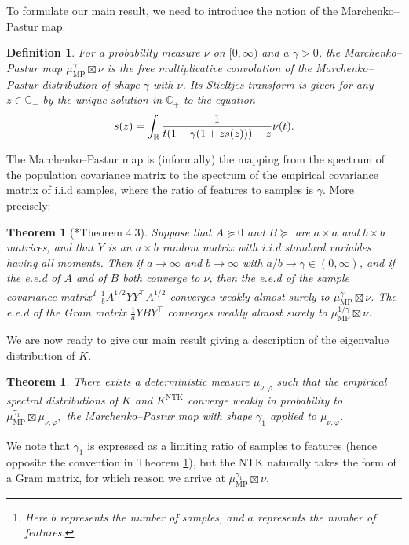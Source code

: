 \documentclass[letterpaper, 10pt, dvipsnames]{article}
\numberwithin{equation}{section}
\newcommand{\Rbb}{\mathbb{R}}
\newcommand{\C}{\mathbb{C}}
\let\d\relax
\newcommand{\d}{\mathrm{d}}
\newtheorem{thm}[ccounter]{Theorem}
\newtheorem{defn}[ccounter]{Definition}
\theoremstyle{definition}
\begin{document}
To formulate our main result, we need to introduce the notion of the Marchenko--Pastur map.
\begin{defn}
  For a probability measure $\nu$ on $[0,\infty)$ and a $\gamma >0$, the \emph{Marchenko--Pastur map $\mu_{\mathrm{MP}}^{\gamma}\boxtimes \nu$} is the free multiplicative convolution of the Marchenko--Pastur distribution of shape $\gamma$ with $\nu$.  Its Stieltjes transform is given for any $z\in\C_+$ by the unique solution in $\C_+$ to the equation
  \begin{equation}\label{eq:mp_map}
  s(z) = \int_\Rbb \frac{1}{t(1-\gamma(1+zs(z)))-z}\d \nu(t).
  \end{equation}
\end{defn}
\noindent The Marchenko--Pastur map is  (informally) the mapping from the spectrum of the population covariance matrix to the spectrum of the empirical covariance matrix of i.i.d samples, where the ratio of features to samples is $\gamma$.  More precisely:
\begin{thm}[\cite{baisilverstein}*{Theorem 4.3}]\label{theo:baisilverstein}
  Suppose that $A \succeq 0$ and $B \succeq$ are $a \times a$ and $b \times b$ matrices, and that $Y$ is an $a \times b$ random matrix with i.i.d standard variables having all moments.  Then if $a \to \infty$ and $b \to \infty$ with $a/b \to \gamma \in (0,\infty)$, and if the e.e.d of $A$ and of $B$ both converge to $\nu$, then the e.e.d of the sample covariance matrix\footnote{Here $b$ represents the number of samples, and $a$ represents the number of features.} $\frac{1}{b}A^{1/2} YY^{\top} A^{1/2}$ converges weakly almost surely to $\mu_{\mathrm{MP}}^{\gamma}\boxtimes \nu$.   The e.e.d of the Gram matrix $\frac{1}{a} Y B Y^{\top}$ converges weakly almost surely to $\mu_{\mathrm{MP}}^{1/\gamma}\boxtimes \nu$.
\end{thm}

We are now ready to give our main result giving a description of the eigenvalue distribution of $K$.
\begin{thm}\label{theo:main}
  There exists a deterministic measure $\mu_{\nu,\varphi}$ such that the empirical spectral distributions of $K$ and $K^{\mathrm{NTK}}$ converge weakly in probability to 
  \(
  \mu_{\mathrm{MP}}^{\gamma_1}\boxtimes \mu_{\nu,\varphi},
  \)
  the Marchenko--Pastur map with shape $\gamma_1$ applied to $\mu_{\nu,\varphi}$.
\end{thm}
\noindent We note that $\gamma_1$ is expressed as a limiting ratio of samples to features (hence opposite the convention in Theorem \ref{theo:baisilverstein}), but the NTK naturally takes the form of a Gram matrix, for which reason we arrive at $\mu_{\mathrm{MP}}^{\gamma_1} \boxtimes \nu$. 
\end{document}
